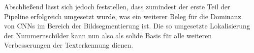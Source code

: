 Abschlie{\ss}end l\"asst sich jedoch feststellen, dass zumindest der erste Teil der
Pipeline erfolgreich umgesetzt wurde, was ein weiterer Beleg f\"ur die
Dominanz von CNNs im Bereich der Bildsegmentierung ist.
Die so umgesetzte Lokalisierung der Nummernschilder kann nun also
als solide Basis f\"ur alle weiteren Verbesserungen der
Texterkennung dienen.
